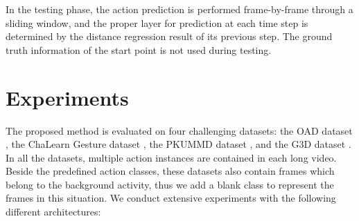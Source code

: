 \documentclass[10pt,twocolumn,letterpaper]{article}
\begin{document}
In the testing phase, the action prediction is performed frame-by-frame through a sliding window,
and the proper layer for prediction at each time step is determined by the distance regression result of its previous step.
The ground truth information of the start point is not used during testing.






\section{Experiments}
\label{sec:experiments}



The proposed method is evaluated on four challenging datasets:
the OAD dataset \cite{li2016online}, the ChaLearn Gesture dataset \cite{escalera2013multi}, the PKUMMD dataset \cite{liu2017pku}, and the G3D dataset \cite{bloom2012g3d}.
In all the datasets, multiple action instances are contained in each long video.
Beside the predefined action classes,
these datasets also contain frames which belong to the background activity,
thus we add a blank class to represent the frames in this situation. We conduct extensive experiments with the following different architectures:
\end{document}
